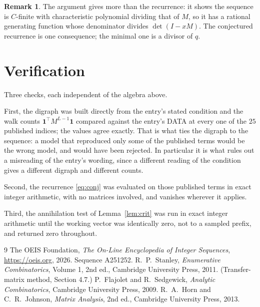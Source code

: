 \documentclass[11pt,a4paper]{article}
\theoremstyle{plain}
\theoremstyle{definition}
\newtheorem{remark}[theorem]{Remark}
\begin{document}
\begin{remark}
The argument gives more than the recurrence: it shows the sequence is $C$-finite with
characteristic polynomial dividing that of $M$, so it has a rational generating function
whose denominator divides $\det(I-xM)$. The conjectured recurrence is one consequence; the
minimal one is a divisor of $q$.
\end{remark}

\section{Verification}

Three checks, each independent of the algebra above.

First, the digraph was built directly from the entry's stated condition and the walk counts
$\mathbf{1}^{\!\top}M^{L-1}\mathbf{1}$ compared against the entry's DATA at
every one of the $25$ published indices; the values agree exactly. That is what ties
the digraph to the sequence: a model that reproduced only some of the published terms would
be the wrong model, and would have been rejected. In particular it is what rules out a
misreading of the entry's wording, since a different reading of the condition gives a
different digraph and different counts.

Second, the recurrence \eqref{eq:conj} was evaluated on those published terms in exact
integer arithmetic, with no matrices involved, and vanishes wherever it applies.

Third, the annihilation test of Lemma~\ref{lem:crit} was run in exact integer arithmetic
until the working vector was identically zero, not to a sampled prefix, and returned zero
throughout.

\begin{thebibliography}{9}
 The OEIS Foundation, \emph{The On-Line Encyclopedia of Integer
Sequences}, \url{https://oeis.org}, 2026. Sequence A251252.
 R.~P.~Stanley, \emph{Enumerative Combinatorics}, Volume 1, 2nd ed.,
Cambridge University Press, 2011. (Transfer-matrix method, Section 4.7.)
 P.~Flajolet and R.~Sedgewick, \emph{Analytic Combinatorics}, Cambridge
University Press, 2009.
 R.~A.~Horn and C.~R.~Johnson, \emph{Matrix Analysis}, 2nd ed., Cambridge
University Press, 2013.
\end{thebibliography}
\end{document}

